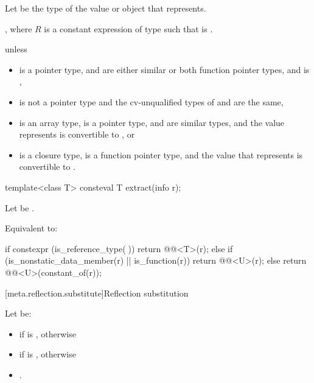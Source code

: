 \begin{itemdescr}
\pnum
Let  be the type of the value or object that  represents.

\pnum
\returns
{},
where $R$ is a constant expression of type 
such that  is .

\pnum
\throws
{} unless
\begin{itemize}
\item
   is a pointer type,
   and  are either similar
  or both function pointer types, and
   is ,
\item
   is not a pointer type
  and the cv-unqualified types of  and  are the same,
\item
   is an array type,
   is a pointer type,
   and  are similar types, and
  the value  represents is convertible to , or
\item
   is a closure type,
   is a function pointer type, and
  the value that  represents is convertible to .
\end{itemize}
\end{itemdescr}

%
\begin{itemdecl}
template<class T>
  consteval T extract(info r);
\end{itemdecl}

\begin{itemdescr}
\pnum
Let  be .

\pnum
\effects
Equivalent to:
\begin{codeblock}
if constexpr (is_reference_type(^^T)) {
  return @@<T>(r);
} else if (is_nonstatic_data_member(r) || is_function(r)) {
  return @@<U>(r);
} else {
  return @@<U>(constant_of(r));
}
\end{codeblock}
\end{itemdescr}

[meta.reflection.substitute]{Reflection substitution}

\pnum
Let  be:
\begin{itemize}
\item
{} if  is , otherwise

\item
{} if  is , otherwise

\item
\tcode{([: x :])}.
\end{itemize}

